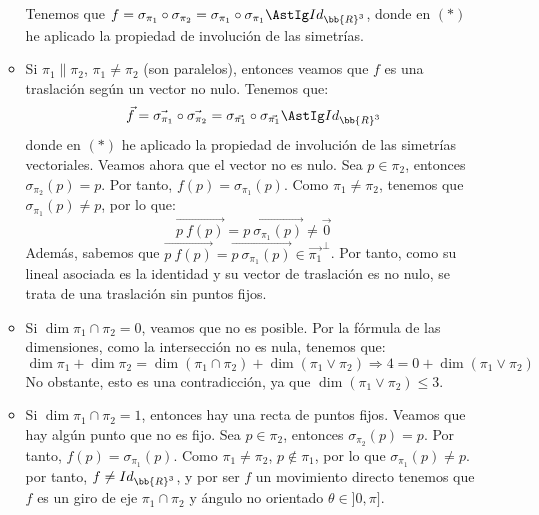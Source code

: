 \begin{ejercicio}
\begin{enumerate}
\begin{itemize}
            Tenemos que $f=\sigma_{\pi_1} \circ \sigma_{\pi_2}=\sigma_{\pi_1} \circ \sigma_{\pi_1} \AstIg Id_{\bb{R}^3}$,
            donde en $(\ast)$ he aplicado la propiedad de involución de las simetrías.

            \item Si $\pi_1 \| \pi_2$, $\pi_1 \neq \pi_2$ (son paralelos), entonces veamos que $f$ es una traslación según un vector no nulo. Tenemos que:
            \begin{equation*}
                \vec{f} = \vec{\sigma_{\pi_1}} \circ \vec{\sigma_{\pi_2}} = \sigma_{\vec{\pi_1}} \circ \sigma_{\vec{\pi_1}} \AstIg Id_{\bb{R}^3}
            \end{equation*}
            donde en $(\ast)$ he aplicado la propiedad de involución de las simetrías vectoriales. Veamos ahora que el vector no es nulo.
            Sea $p\in \pi_2$, entonces $\sigma_{\pi_2}(p)=p$. Por tanto, $f(p)=\sigma_{\pi_1}(p)$. Como $\pi_1 \neq \pi_2$, tenemos que $\sigma_{\pi_1}(p) \neq p$, por lo que:
            \begin{equation*}
                \vec{p~f(p)} = \vec{p~\sigma_{\pi_1}(p)} \neq \vec{0}
            \end{equation*}
            Además, sabemos que $\vec{p~f(p)} = \vec{p~\sigma_{\pi_1}(p)} \in \vec{\pi_1}^\perp$.
            Por tanto, como su lineal asociada es la identidad y su vector de traslación es no nulo, se trata de una traslación sin puntos fijos.

            \item Si $\dim \pi_1 \cap \pi_2 = 0$, veamos que no es posible. Por la fórmula de las dimensiones, como la intersección no es nula, tenemos que:
            \begin{equation*}
                \dim \pi_1 + \dim \pi_2 = \dim (\pi_1 \cap \pi_2) + \dim (\pi_1 \vee \pi_2) \Longrightarrow 4 = 0 + \dim (\pi_1 \vee \pi_2)
            \end{equation*}
            No obstante, esto es una contradicción, ya que $\dim (\pi_1 \vee \pi_2) \leq 3$.

            \item Si $\dim \pi_1 \cap \pi_2 = 1$, entonces hay una recta de puntos fijos.
            Veamos que hay algún punto que no es fijo. Sea $p\in \pi_2$, entonces $\sigma_{\pi_2}(p)=p$. Por tanto, $f(p)=\sigma_{\pi_1}(p)$. Como $\pi_1 \neq \pi_2$, $p\notin \pi_1$, por lo que $\sigma_{\pi_1}(p) \neq p$.
            por tanto, $f\neq Id_{\bb{R}^3}$, y por ser $f$ un movimiento directo tenemos que $f$ es un giro de eje $\pi_1 \cap \pi_2$ y ángulo no orientado $\theta \in ]0, \pi]$.
        \end{itemize}


\end{enumerate}
\end{ejercicio}
